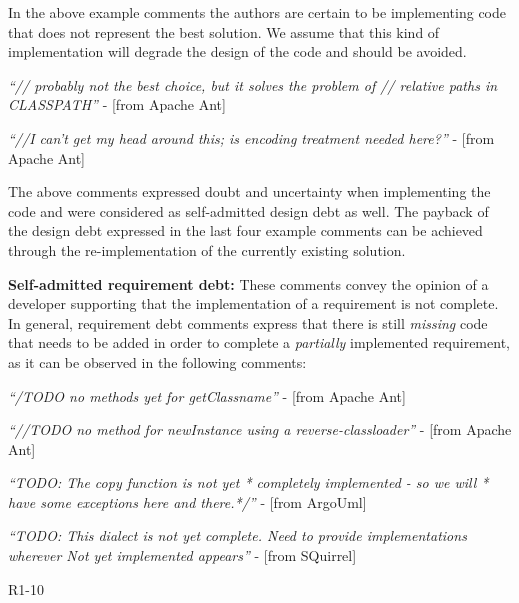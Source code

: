 {In the above example comments the authors are certain to be implementing code that does not represent the best solution. We assume that this kind of implementation will degrade the design of the code and should be avoided. 

\vspace{1mm}
    \begin{displayquote}
        \textit{``// probably not the best choice, but it solves the problem of // relative paths in CLASSPATH''} - [from Apache Ant]
    \end{displayquote}
    \vspace{1mm}
    \begin{displayquote}   
        \textit{``//I can't get my head around this; is encoding treatment needed here?''} - [from Apache Ant]
    \end{displayquote}
\vspace{1mm}

The above comments expressed doubt and uncertainty when implementing the code and were considered as self-admitted design debt as well.
The payback of the design debt expressed in the last four example comments can be achieved through the re-implementation of the currently existing solution.

\vspace{1mm}
\noindent\textbf{Self-admitted requirement debt:} These comments convey the opinion of a developer supporting that the implementation of a requirement is not complete.  In general, requirement debt comments express
that there is still \emph{missing} code that needs to be added in order to complete a \emph{partially} implemented requirement, as it can be observed in the following comments:

\vspace{1mm}
    \begin{displayquote}
        \textit{``/TODO no methods yet for getClassname''} - [from Apache Ant]
    \end{displayquote}
    \vspace{1mm}
    \begin{displayquote}
        \textit{``//TODO no method for newInstance using a reverse-classloader''} - [from Apache Ant]
    \end{displayquote}
    \vspace{1mm}
    \begin{displayquote}
        \textit{``TODO: The copy function is not yet * completely implemented - so we will  * have some exceptions here and there.*/''} - [from ArgoUml]  
    \end{displayquote}
    \vspace{1mm}
    \begin{displayquote}
        \textit{``TODO: This dialect is not yet complete. Need to provide implementations wherever \textit{Not yet implemented} appears''} - [from SQuirrel]  
    \end{displayquote}
    \vspace{1mm}
\vspace{1mm}  

}{R1-10}

